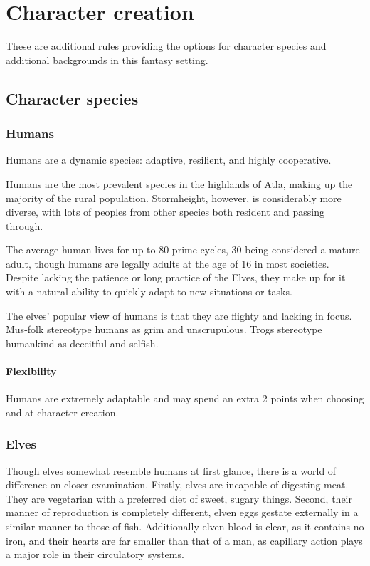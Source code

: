 \documentclass[a4paper,11pt,oneside]{book}
\newcommand{\textlf}[1]{\textbf{\titlecap{#1}}}
\begin{document}
\chapter{Character creation}
These are additional rules providing the options for character species and additional backgrounds in this fantasy setting.

\section{Character species}

\subsection{Humans}
Humans are a dynamic species: adaptive, resilient, and highly cooperative.

Humans are the most prevalent species in the highlands of Atla, making up the majority of the rural population. Stormheight, however, is considerably more diverse, with lots of peoples from other species both resident and passing through.

The average human lives for up to 80 prime cycles, 30 being considered a mature adult, though humans are legally adults at the age of 16 in most societies. Despite lacking the patience or long practice of the Elves, they make up for it with a natural ability to quickly adapt to new situations or tasks. 

The elves' popular view of humans is that they are flighty and lacking in focus. Mus-folk stereotype humans as grim and unscrupulous. Trogs stereotype humankind as deceitful and selfish.  

\subsubsection*{Flexibility}
Humans are extremely adaptable and may spend an extra 2 points when choosing \textlf{perks} and \textlf{proficiencies} at character creation.


\subsection{Elves}
Though elves somewhat resemble humans at first glance, there is a world of difference on closer examination. Firstly, elves are incapable of digesting meat. They are vegetarian with a preferred diet of sweet, sugary things. Second, their manner of reproduction is completely different, elven eggs gestate externally in a similar manner to those of fish. Additionally elven blood is clear, as it contains no iron, and their hearts are far smaller than that of a man, as capillary action plays a major role in their circulatory systems.
\end{document}
